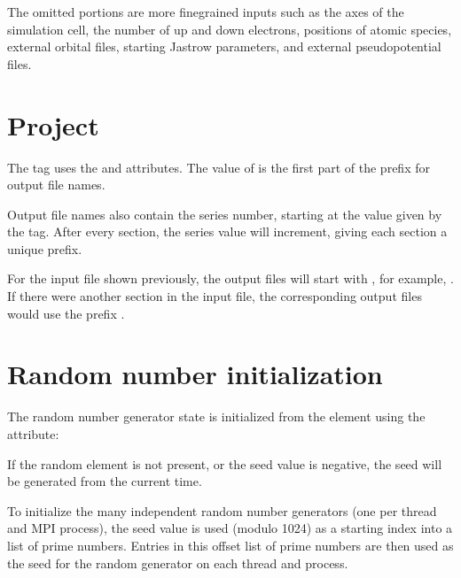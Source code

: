 \documentclass[letterpaper,10pt,english]{sphinxmanual}
\begin{document}
The omitted portions  are more fine\sphinxhyphen{}grained inputs such as the axes of the simulation cell, the number of up and down electrons, positions of atomic species, external orbital files, starting Jastrow parameters, and external pseudopotential files.


\section{Project}
\label{\detokenize{input_overview:project}}
The  tag uses the  and  attributes.
The value of  is the first part of the prefix for output file names.

Output file names also contain the series number, starting at the value given by the
 tag.  After every  section, the series value will increment, giving each section a unique prefix.

For the input file shown previously, the output files will start with , for example, .
If there were another  section in the input file, the corresponding output files would use the prefix .


\section{Random number initialization}
\label{\detokenize{input_overview:random-number-initialization}}
The random number generator state is initialized from the  element using the  attribute:

\begin{sphinxVerbatim}[commandchars=\\\{\}]
 
\end{sphinxVerbatim}

If the random element is not present, or the seed value is negative, the seed will be generated from the current time.

To initialize the many independent random number generators (one per thread and MPI process), the seed value is used (modulo 1024) as a starting index into a list of prime numbers.
Entries in this offset list of prime numbers are then used as the seed for the random generator on each thread and process.
\end{document}
